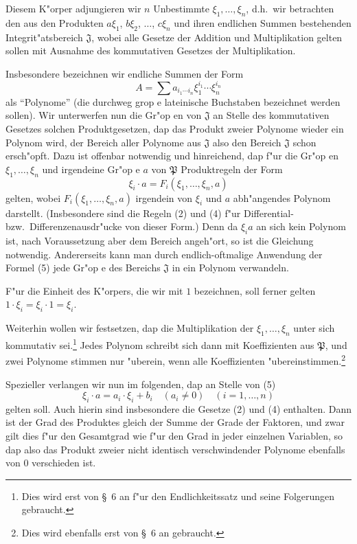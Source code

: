 \documentclass[12pt,a4paper]{article}
\begin{document}
Diesem K"orper adjungieren wir $n$ Unbestimmte $\xi_1,\ldots,\xi_n$, d.h.\ wir betrachten den aus den Produkten $a\xi_1$, $b\xi_2$, $\ldots$, $c\xi_n$ und ihren endlichen Summen bestehenden Integrit"atsbereich $\mathfrak{J}$, wobei alle Gesetze der Addition und Multiplikation gelten sollen mit Ausnahme des kommutativen Gesetzes der Multiplikation.

Insbesondere bezeichnen wir endliche Summen der Form
\[
A = \sum a_{i_1 \cdots i_n} \xi_1^{i_1} \cdots \xi_n^{i_n}
\]
als ``Polynome'' (die durchweg grop e lateinische Buchstaben bezeichnet werden sollen). Wir unterwerfen nun die Gr"op en von $\mathfrak{J}$ an Stelle des kommutativen Gesetzes solchen Produktgesetzen, dap das Produkt zweier Polynome wieder ein Polynom wird, der Bereich aller Polynome aus $\mathfrak{J}$ also den Bereich $\mathfrak{J}$ schon ersch"opft. Dazu ist offenbar notwendig und hinreichend, dap f"ur die Gr"op en $\xi_1,\ldots,\xi_n$ und irgendeine Gr"op e $a$ von $\mathfrak{P}$ Produktregeln der Form
\begin{equation}
\xi_i \cdot a = F_i(\xi_1,\ldots,\xi_n,a) \tag{5}
\end{equation}
gelten, wobei $F_i(\xi_1,\ldots,\xi_n,a)$ irgendein von $\xi_i$ und $a$ abh"angendes Polynom darstellt. (Insbesondere sind die Regeln (2) und (4) f"ur Differential- bzw.\ Differenzenausdr"ucke von dieser Form.) Denn da $\xi_i a$ an sich kein Polynom ist, nach Voraussetzung aber dem Bereich angeh"ort, so ist die Gleichung notwendig. Andererseits kann man durch endlich-oftmalige Anwendung der Formel (5) jede Gr"op e des Bereichs $\mathfrak{J}$ in ein Polynom verwandeln.

F"ur die Einheit des K"orpers, die wir mit $1$ bezeichnen, soll ferner gelten $1\cdot\xi_i = \xi_i\cdot 1 = \xi_i$.

Weiterhin wollen wir festsetzen, dap die Multiplikation der $\xi_1,\ldots,\xi_n$ unter sich kommutativ sei.\footnote{Dies wird erst von \S\ 6 an f"ur den Endlichkeitssatz und seine Folgerungen gebraucht.} Jedes Polynom schreibt sich dann mit Koeffizienten aus $\mathfrak{P}$, und zwei Polynome stimmen nur "uberein, wenn alle Koeffizienten "ubereinstimmen.\footnote{Dies wird ebenfalls erst von \S\ 6 an gebraucht.}

Spezieller verlangen wir nun im folgenden, dap an Stelle von (5)
\begin{equation}
\xi_i \cdot a = a_i \cdot \xi_i + b_i \quad (a_i \neq 0) \quad (i=1,\ldots,n) \tag{6}
\end{equation}
gelten soll. Auch hierin sind insbesondere die Gesetze (2) und (4) enthalten. Dann ist der Grad des Produktes gleich der Summe der Grade der Faktoren, und zwar gilt dies f"ur den Gesamtgrad wie f"ur den Grad in jeder einzelnen Variablen, so dap also das Produkt zweier nicht identisch verschwindender Polynome ebenfalls von $0$ verschieden ist.
\end{document}
